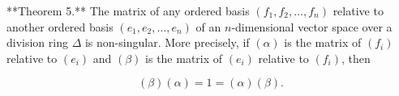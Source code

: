 **Theorem 5.** The matrix of any ordered basis $(f_1, f_2, \ldots, f_n)$ relative to another ordered basis $(e_1, e_2, \ldots, e_n)$ of an $n$-dimensional vector space over a division ring $\Delta$ is non-singular. More precisely, if $(\alpha)$ is the matrix of $(f_i)$ relative to $(e_i)$ and $(\beta)$ is the matrix of $(e_i)$ relative to $(f_i)$, then

$$(\beta)(\alpha) = 1 = (\alpha)(\beta).$$
